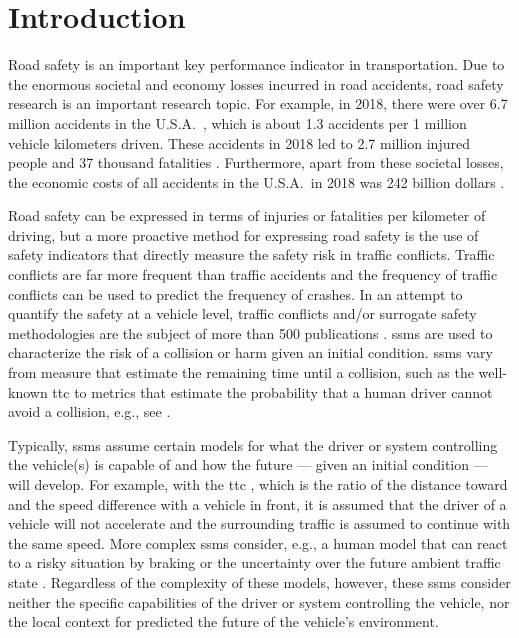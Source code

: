 \section{Introduction}
\label{sec:introduction}

Road safety is an important key performance indicator in transportation. 
Due to the enormous societal and economy losses incurred in road accidents, road safety research is an important research topic.
For example, in 2018, there were over 6.7 million accidents in the U.S.A.\ \autocite{nhtsa2020summary}, which is about 1.3 accidents per 1 million vehicle kilometers driven.
These accidents in 2018 led to 2.7 million injured people and 37 thousand fatalities \autocite{nhtsa2020summary}.
Furthermore, apart from these societal losses, the economic costs of all accidents in the U.S.A.\ in 2018 was 242 billion dollars \autocite{nhtsa2020summary}.

Road safety can be expressed in terms of injuries or fatalities per kilometer of driving, but a more proactive method for expressing road safety is the use of safety indicators that directly measure the safety risk in traffic conflicts.
Traffic conflicts are far more frequent than traffic accidents and the frequency of traffic conflicts can be used to predict the frequency of crashes.
In an attempt to quantify the safety at a vehicle level, traffic conflicts and/or surrogate safety methodologies are the subject of more than 500 publications \autocite{arun2021systematic}.
\acp{ssm} are used to characterize the risk of a collision or harm given an initial condition. 
\acp{ssm} vary from measure that estimate the remaining time until a collision, such as the well-known \ac{ttc} \autocite{hayward1972near} to metrics that estimate the probability that a human driver cannot avoid a collision, e.g., see \autocite{wang2014evaluation}.

Typically, \acp{ssm} assume certain models for what the driver or system controlling the vehicle(s) is capable of and how the future --- given an initial condition --- will develop. 
For example, with the \ac{ttc} \autocite{hayward1972near}, which is the ratio of the distance toward and the speed difference with a vehicle in front, it is assumed that the driver of a vehicle will not accelerate and the surrounding traffic is assumed to continue with the same speed. 
More complex \acp{ssm} consider, e.g., a human model that can react to a risky situation by braking \autocite{wang2014evaluation} or the uncertainty over the future ambient traffic state \autocite{mullakkal2020probabilistic}.
Regardless of the complexity of these models, however, these \acp{ssm} consider neither the specific capabilities of the driver or system controlling the vehicle, nor the local context for predicted the future of the vehicle's environment.  %


